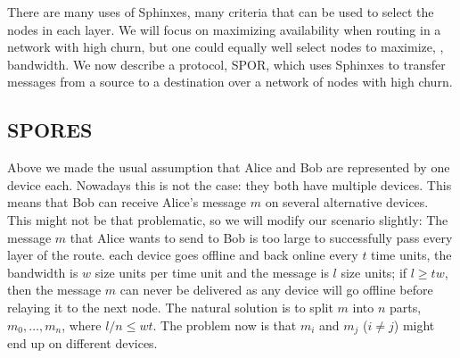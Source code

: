 There are many uses of Sphinxes, many criteria that can be used to select the 
nodes in each layer.
We will focus on maximizing availability when routing in a network with high 
churn, but one could equally well select nodes to maximize, \eg, bandwidth.
We now describe a protocol, \ac{SPOR}, which uses Sphinxes to transfer messages 
from a source to a destination over a network of nodes with high churn.


\subsection{\Acf*{SPORES}}

Above we made the usual assumption that Alice and Bob are represented by one 
device each.
Nowadays this is not the case: they both have multiple devices.
This means that Bob can receive Alice's message \(m\) on several alternative 
devices.
This might not be that problematic, so we will modify our scenario slightly:
The message \(m\) that Alice wants to send to Bob is too large to successfully 
pass every layer of the route.
\Eg each device goes offline and back online every \(t\) time units, the 
bandwidth is \(w\) size units per time unit and the message is \(l\) size 
units; if \(l\geq t w\), then the message \(m\) can never be delivered as any 
device will go offline before relaying it to the next node.
The natural solution is to split \(m\) into \(n\) parts, \(m_0, \dotsc, m_n\), 
where \(l/n\leq w t\).
The problem now is that \(m_i\) and \(m_j\) (\(i\neq j\)) might end up on 
different devices.

